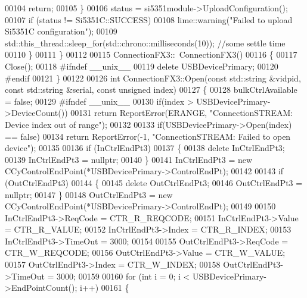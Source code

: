 \begin{DoxyCode}
00104             \textcolor{keywordflow}{return};
00105         \}
00106         status = si5351module->UploadConfiguration();
00107         \textcolor{keywordflow}{if} (status != Si5351C::SUCCESS)
00108             lime::warning(\textcolor{stringliteral}{"Failed to upload Si5351C configuration"});
00109         std::this\_thread::sleep\_for(std::chrono::milliseconds(10)); \textcolor{comment}{//some settle time}
00110     \}
00111 \}
00112 
00115 ConnectionFX3::~ConnectionFX3()
00116 \{
00117     Close();
00118 \textcolor{preprocessor}{#ifndef \_\_unix\_\_}
00119     \textcolor{keyword}{delete} USBDevicePrimary;
00120 \textcolor{preprocessor}{#endif}
00121 \}
00122 
00126 \textcolor{keywordtype}{int} ConnectionFX3::Open(\textcolor{keyword}{const} std::string &vidpid, \textcolor{keyword}{const} std::string &serial, \textcolor{keyword}{const} \textcolor{keywordtype}{unsigned} 
      index)
00127 \{
00128     bulkCtrlAvailable = \textcolor{keyword}{false};
00129 \textcolor{preprocessor}{#ifndef \_\_unix\_\_}
00130     \textcolor{keywordflow}{if}(index > USBDevicePrimary->DeviceCount())
00131         \textcolor{keywordflow}{return} ReportError(ERANGE, \textcolor{stringliteral}{"ConnectionSTREAM: Device index out of range"});
00132 
00133     \textcolor{keywordflow}{if}(USBDevicePrimary->Open(index) == \textcolor{keyword}{false})
00134         \textcolor{keywordflow}{return} ReportError(-1, \textcolor{stringliteral}{"ConnectionSTREAM: Failed to open device"});
00135 
00136     \textcolor{keywordflow}{if} (InCtrlEndPt3)
00137     \{
00138         \textcolor{keyword}{delete} InCtrlEndPt3;
00139         InCtrlEndPt3 = \textcolor{keyword}{nullptr};
00140     \}
00141     InCtrlEndPt3 = \textcolor{keyword}{new} CCyControlEndPoint(*USBDevicePrimary->ControlEndPt);
00142 
00143     \textcolor{keywordflow}{if} (OutCtrlEndPt3)
00144     \{
00145         \textcolor{keyword}{delete} OutCtrlEndPt3;
00146         OutCtrlEndPt3 = \textcolor{keyword}{nullptr};
00147     \}
00148     OutCtrlEndPt3 = \textcolor{keyword}{new} CCyControlEndPoint(*USBDevicePrimary->ControlEndPt);
00149 
00150     InCtrlEndPt3->ReqCode = CTR_R_REQCODE;
00151     InCtrlEndPt3->Value = CTR_R_VALUE;
00152     InCtrlEndPt3->Index = CTR_R_INDEX;
00153     InCtrlEndPt3->TimeOut = 3000;
00154 
00155     OutCtrlEndPt3->ReqCode = CTR_W_REQCODE;
00156     OutCtrlEndPt3->Value = CTR_W_VALUE;
00157     OutCtrlEndPt3->Index = CTR_W_INDEX;
00158     OutCtrlEndPt3->TimeOut = 3000;
00159 
00160     \textcolor{keywordflow}{for} (\textcolor{keywordtype}{int} i = 0; i < USBDevicePrimary->EndPointCount(); i++)
00161     \{

\end{DoxyCode}
